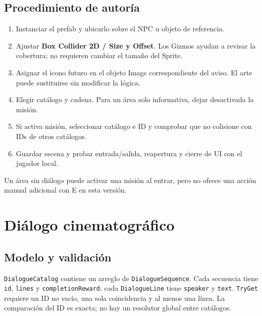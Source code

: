\documentclass[11pt,letterpaper,oneside]{article}
\newcommand{\code}[1]{\nolinkurl{#1}}
\begin{document}
\subsection{Procedimiento de autoría}
\begin{enumerate}
\item Instanciar el prefab y ubicarlo sobre el NPC u objeto de referencia.
\item Ajustar \textbf{Box Collider 2D / Size y Offset}. Los Gizmos ayudan a revisar la cobertura; no requieren cambiar el tamaño del Sprite.
\item Asignar el icono futuro en el objeto Image correspondiente del aviso. El arte puede sustituirse sin modificar la lógica.
\item Elegir catálogo y cadena. Para un área solo informativa, dejar desactivada la misión.
\item Si activa misión, seleccionar catálogo e ID y comprobar que no colisione con IDs de otros catálogos.
\item Guardar escena y probar entrada/salida, reapertura y cierre de UI con el jugador local.
\end{enumerate}
Un área sin diálogo puede activar una misión al entrar, pero no ofrece una acción manual adicional con E en esta versión.

\section{Diálogo cinematográfico}
\subsection{Modelo y validación}
\code{DialogueCatalog} contiene un arreglo de \code{DialogueSequence}. Cada secuencia tiene \code{id}, \code{lines} y \code{completionReward}; cada \code{DialogueLine} tiene \code{speaker} y \code{text}. \code{TryGet} requiere un ID no vacío, una sola coincidencia y al menos una línea. La comparación del ID es exacta; no hay un resolutor global entre catálogos.
\end{document}
